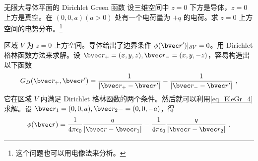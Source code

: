 \begin{example}{无限大导体平面的 Dirichlet Green 函数}
设三维空间中 $z=0$ 下方是导体，$z=0$ 上方是真空。在 $(0,0,a)(a>0)$ 处有一个电荷量为 $+q$ 的电荷。求 $z=0$ 上方空间的电势分布。\footnote{这个问题也可以用电像法来分析。}

区域 $V$ 为 $z=0$ 上方空间。导体给出了边界条件 $\phi(\bvec r')|_{\partial V}=0$。用 Dirichlet 格林函数方法来求解。设 $\bvec r_+=(x,y,z),\bvec r_-=(x,y,-z)$，容易构造出以下函数
\begin{equation}
G_D(\bvec r_+,\bvec r')=\frac{1}{|\bvec r_+-\bvec r'|}-\frac{1}{|\bvec r_--\bvec r'|}~,
\end{equation}
它在区域 $V$ 内满足 Dirichlet 格林函数的两个条件。然后就可以利用\autoref{eq_EleGr_4} 求解。设 $\bvec r_1=(0,0,a),\bvec r_2-=(0,0,-a)$，得
\begin{equation}
\phi(\bvec r)=\frac{1}{4\pi \epsilon_0}\frac{q}{|\bvec r-\bvec r_1|}-\frac{1}{4\pi \epsilon_0}\frac{q}{|\bvec r-\bvec r_2|}~.
\end{equation}

\end{example}
